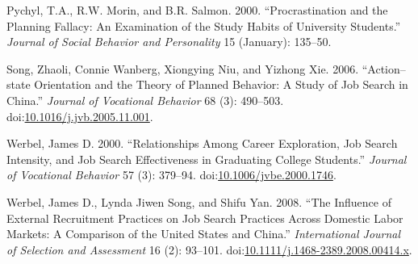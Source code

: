 \documentclass[]{elsarticle} %
\begin{document}
\hypertarget{ref-pychyl_procrastination_2000}{}
Pychyl, T.A., R.W. Morin, and B.R. Salmon. 2000. ``Procrastination and
the Planning Fallacy: An Examination of the Study Habits of University
Students.'' \emph{Journal of Social Behavior and Personality} 15
(January): 135--50.

\hypertarget{ref-song_actionstate_2006}{}
Song, Zhaoli, Connie Wanberg, Xiongying Niu, and Yizhong Xie. 2006.
``Action--state Orientation and the Theory of Planned Behavior: A Study
of Job Search in China.'' \emph{Journal of Vocational Behavior} 68 (3):
490--503.
doi:\href{https://doi.org/10.1016/j.jvb.2005.11.001}{10.1016/j.jvb.2005.11.001}.

\hypertarget{ref-werbel_relationships_2000}{}
Werbel, James D. 2000. ``Relationships Among Career Exploration, Job
Search Intensity, and Job Search Effectiveness in Graduating College
Students.'' \emph{Journal of Vocational Behavior} 57 (3): 379--94.
doi:\href{https://doi.org/10.1006/jvbe.2000.1746}{10.1006/jvbe.2000.1746}.

\hypertarget{ref-werbel_influence_2008}{}
Werbel, James D., Lynda Jiwen Song, and Shifu Yan. 2008. ``The Influence
of External Recruitment Practices on Job Search Practices Across
Domestic Labor Markets: A Comparison of the United States and China.''
\emph{International Journal of Selection and Assessment} 16 (2):
93--101.
doi:\href{https://doi.org/10.1111/j.1468-2389.2008.00414.x}{10.1111/j.1468-2389.2008.00414.x}.
\end{document}

